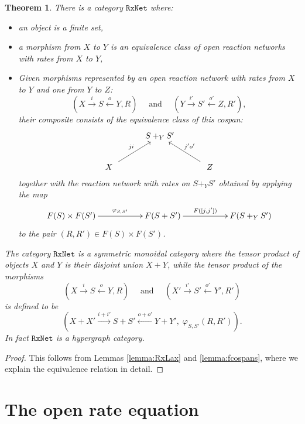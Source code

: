 \documentclass{compositionalityarticle}
\newcommand{\RxNet}{\mathtt{RxNet}}
\theoremstyle{compositionality}
\newtheorem{thm}{Theorem}
\theoremstyle{remark}
\begin{document}
\begin{thm}
\label{thm:RxNet}
There is a category $\RxNet$ where:
\begin{itemize}
\item an object is a finite set,
\item a morphism from $X$ to $Y$ is an equivalence class of open reaction networks 
with rates from $X$ to $Y$, 
\item Given morphisms represented by an open reaction network with rates from $X$ to $Y$ and one from $Y$ to $Z$:
 \[
    (X \stackrel{i}\longrightarrow S \stackrel{o}\longleftarrow Y, R) 
    \quad \textrm{ and } \quad
    (Y \stackrel{i'}\longrightarrow S' \stackrel{o'}\longleftarrow Z, R'), 
  \]
their composite consists of the equivalence class of this cospan:
  \[
    \xymatrix{
      & S +_Y S' \\
      \quad X\quad \ar[ur]^{ji} && \quad Z \quad \ar[ul]_{j'o'}
    }
  \]
together with the reaction network with rates on $S +_Y S'$ 
obtained by applying the map
\[      
\xymatrix{      F(S) \times F(S') \ar[rr]^-{\varphi_{S,S'}} && 
                     F(S + S') \ar[rr]^-{F([j,j'])} && F(S +_Y S') } \]
to the pair $(R,R') \in F(S) \times F(S')$.  
\end{itemize}
The category $\RxNet$ is a symmetric monoidal category where the tensor product of objects $X$ and $Y$ is their disjoint union $X + Y$, while the tensor product of the morphisms
\[
    (X \stackrel{i}{\longrightarrow} S \stackrel{o}{\longleftarrow} Y, R) 
    \quad \textrm{ and } \quad
    (X' \stackrel{i'}{\longrightarrow} S' \stackrel{o'}{\longleftarrow} Y', R') 
  \]
is defined to be
\[  ( X + X' \stackrel{i+i'}{\longrightarrow} S + S'  \stackrel{o + o'}{\longleftarrow} Y + Y', \; \varphi_{S,S'}(R,R') ) .\]
In fact $\RxNet$ is a hypergraph category.
\end{thm}

\begin{proof}
This follows from Lemmas \ref{lemma:RxLax} and \ref{lemma:fcospans}, 
where we explain the equivalence relation in detail.  
\end{proof}

\section{The open rate equation}
\label{sec:openrate}
\end{document}
